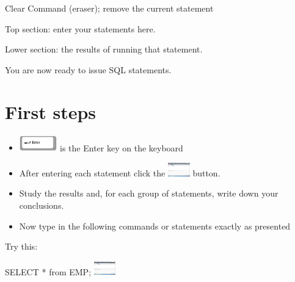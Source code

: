 \begin{center}
\begin{minipage}{2.789cm}
Clear Command (eraser); remove the current statement

\end{minipage}
\end{center}
\begin{center}
\begin{minipage}{4.706cm}
Top section: enter your statements here.
\end{minipage}
\end{center}


\begin{center}
\begin{minipage}{4.944cm}
Lower section: the results of running that statement.
\end{minipage}
\end{center}
You are now ready to issue SQL statements.

\section{First steps}
\begin{itemize}
\item 
\includegraphics[width=1.63cm,height=0.683cm]{images/img (8).png}
  is the Enter key on the keyboard 
\end{itemize}
\begin{itemize}
\item After entering each statement click the 
\includegraphics[width=0.947cm,height=0.607cm]{images/img (9).png}
  button. 
\end{itemize}
\begin{itemize}
\item Study the results and, for each group of statements, write down your conclusions.
\end{itemize}
\begin{itemize}
\item Now type in the following commands or statements exactly as presented
\end{itemize}
Try this:

SELECT  *  from EMP; 
\includegraphics[width=0.947cm,height=0.607cm]{images/img (9).png}
 

